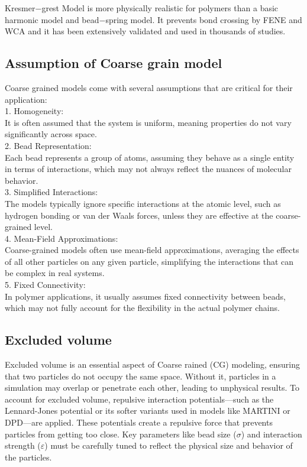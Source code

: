 \documentclass[12pt]{article}
\begin{document}
\begin{flushleft}
Kresmer$-$grest Model is more physically realistic for polymers than a basic harmonic model and bead$-$spring model.
It prevents bond crossing by FENE and WCA and it has been extensively validated and used in thousands of studies.



\subsection*{Assumption of Coarse grain model}
Coarse grained models come with several assumptions that are critical for their application:\\
    1. Homogeneity:\\
    It is often assumed that the system is uniform, meaning properties do not vary significantly across space. \\
    2. Bead Representation:\\
        Each bead represents a group of atoms, assuming they behave as a single entity in terms of interactions, which may not always reflect the nuances of molecular behavior. \\
    3. Simplified Interactions:\\
        The models typically ignore specific interactions at the atomic level, such as hydrogen bonding or van der Waals forces, unless they are effective at the coarse-grained level. \\
    4. Mean-Field Approximations:\\
        Coarse-grained models often use mean-field approximations, averaging the effects of all other particles on any given particle, simplifying the interactions that can be complex in real systems. \\
    5. Fixed Connectivity:\\
        In polymer applications, it usually assumes fixed connectivity between beads, which may not fully account for the flexibility in the actual polymer chains. \\ 

\subsection*{Excluded volume}

Excluded volume is an essential aspect of Coarse rained (CG) modeling, ensuring that two particles do not occupy the same space. Without it, particles in a simulation may overlap or penetrate each other, leading to unphysical results. To account for excluded volume, repulsive interaction potentials—such as the Lennard-Jones potential or its softer variants used in models like MARTINI or DPD—are applied. These potentials create a repulsive force that prevents particles from getting too close. Key parameters like bead size ($\sigma$) and interaction strength ($\varepsilon$) must be carefully tuned to reflect the physical size and behavior of the particles.


\end{flushleft}
\end{document}
